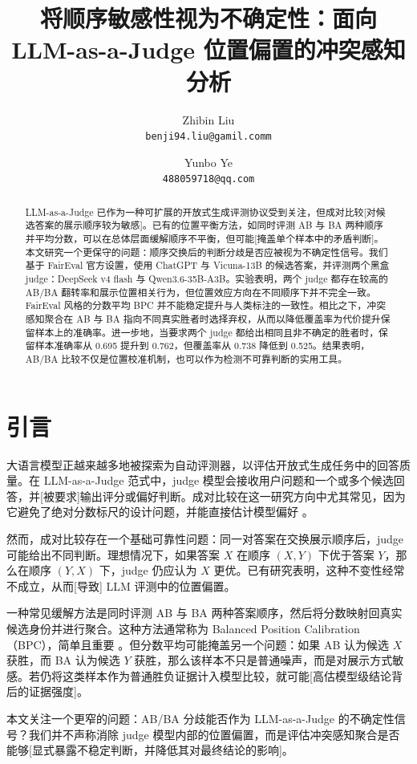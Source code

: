 \documentclass[11pt]{ctexart}
\title{将顺序敏感性视为不确定性：面向 LLM-as-a-Judge 位置偏置的冲突感知分析}
\author{Zhibin Liu\\ \texttt{benji94.liu@gamil.comm} \and Yunbo Ye\\ \texttt{488059718@qq.com}}
\date{}
\begin{document}
\maketitle

\begin{abstract}
LLM-as-a-Judge 已作为一种可扩展的开放式生成评测协议受到关注，但成对比较[对候选答案的展示顺序较为敏感]。已有的位置平衡方法，如同时评测 AB 与 BA 两种顺序并平均分数，可以在总体层面缓解顺序不平衡，但可能[掩盖单个样本中的矛盾判断]。本文研究一个更保守的问题：顺序交换后的判断分歧是否应被视为不确定性信号。我们基于 FairEval 官方设置，使用 ChatGPT 与 Vicuna-13B 的候选答案，并评测两个黑盒 judge：DeepSeek v4 flash 与 Qwen3.6-35B-A3B。实验表明，两个 judge 都存在较高的 AB/BA 翻转率和展示位置相关行为，但位置效应方向在不同顺序下并不完全一致。FairEval 风格的分数平均 BPC 并不能稳定提升与人类标注的一致性。相比之下，冲突感知聚合在 AB 与 BA 指向不同真实胜者时选择弃权，从而以降低覆盖率为代价提升保留样本上的准确率。进一步地，当要求两个 judge 都给出相同且非不确定的胜者时，保留样本准确率从 0.695 提升到 0.762，但覆盖率从 0.738 降低到 0.525。结果表明，AB/BA 比较不仅是位置校准机制，也可以作为检测不可靠判断的实用工具。
\end{abstract}

\section{引言}

大语言模型正越来越多地被探索为自动评测器，以评估开放式生成任务中的回答质量。在 LLM-as-a-Judge 范式中，judge 模型会接收用户问题和一个或多个候选回答，并[被要求]输出评分或偏好判断。成对比较在这一研究方向中尤其常见，因为它避免了绝对分数标尺的设计问题，并能直接估计模型偏好 \cite{zheng2023judging,liu2023geval}。

然而，成对比较存在一个基础可靠性问题：同一对答案在交换展示顺序后，judge 可能给出不同判断。理想情况下，如果答案 $X$ 在顺序 $(X,Y)$ 下优于答案 $Y$，那么在顺序 $(Y,X)$ 下，judge 仍应认为 $X$ 更优。已有研究表明，这种不变性经常不成立，从而[导致] LLM 评测中的位置偏置。

一种常见缓解方法是同时评测 AB 与 BA 两种答案顺序，然后将分数映射回真实候选身份并进行聚合。这种方法通常称为 Balanced Position Calibration（BPC），简单且重要 \cite{wang2024faireval}。但分数平均可能掩盖另一个问题：如果 AB 认为候选 $X$ 获胜，而 BA 认为候选 $Y$ 获胜，那么该样本不只是普通噪声，而是对展示方式敏感。若仍将这类样本作为普通胜负证据计入模型比较，就可能[高估模型级结论背后的证据强度]。

本文关注一个更窄的问题：AB/BA 分歧能否作为 LLM-as-a-Judge 的不确定性信号？我们并不声称消除 judge 模型内部的位置偏置，而是评估冲突感知聚合是否能够[显式暴露不稳定判断，并降低其对最终结论的影响]。
\end{document}
